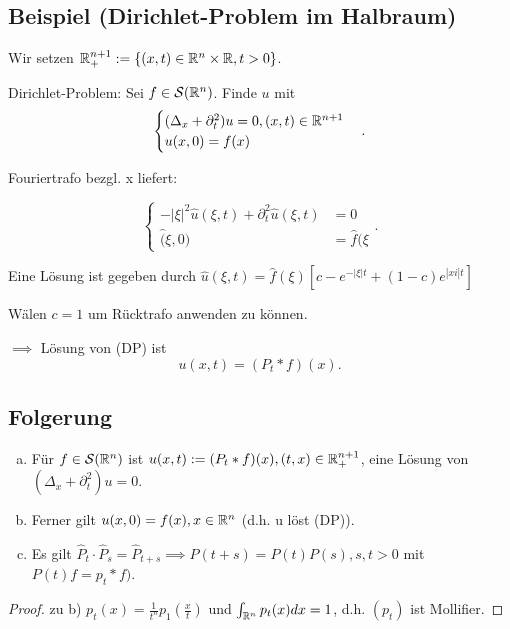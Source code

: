 \subsection{Beispiel (Dirichlet-Problem im Halbraum)}

Wir setzen $\mathbb{R}_+^{n+1} := \{ (x,t) \in \mathbb{R}^n \times \mathbb{R}, t > 0\}$.

Dirichlet-Problem: Sei $f \in \mathcal{S}(\mathbb{R}^n)$. Finde $u$ mit 
$$\begin{cases} (\Delta_x + \partial_t^2)u = 0, (x,t) \in \mathbb{R}^{n+1} \\ u(x,0) = f(x) \end{cases}.$$

Fouriertrafo bezgl. x liefert: 

$$
\begin{cases}
  -|\xi|^2 \hat u(\xi, t) + \partial_t^2 \hat u(\xi, t) &= 0 \\
  \hat(\xi, 0) &= \hat f(\xi
\end{cases}.
$$

Eine Lösung ist gegeben durch $\hat u(\xi, t) = \hat f(\xi) [ c - e^{-|\xi|t} + (1 - c) e^{|xi|t}]$

Wälen $c = 1$ um Rücktrafo anwenden zu können.

$\implies$ Lösung von (DP) ist
$$
u(x,t) = (P_t \ast f) (x).
$$

\subsection{Folgerung}

\begin{enumerate}[a)]
  \item Für $f \in \mathcal{S}(\mathbb{R}^n)$ ist $u(x,t) := (P_t \ast f)(x), (t,x) \in \mathbb{R}^{n+1}_+$, eine Lösung von $(\Delta_x + \partial_t^2)u = 0$.
  \item Ferner gilt $u(x,0) = f(x), x \in \mathbb{R}^n$ (d.h. u löst (DP)).
  \item Es gilt $\hat P_t \cdot \hat P_s = \hat P_{t + s} \implies P(t + s) = P(t)P(s), s,t > 0$ mit $P(t)f = p_t \ast f)$.
\end{enumerate}

\begin{proof}
  zu b) $p_t(x) = \frac{1}{t^n} p_1(\frac{x}{t})$ und $\int_{\mathbb{R}^n} p_t(x) dx = 1$, d.h. $(p_t)$ ist Mollifier.
\end{proof}

